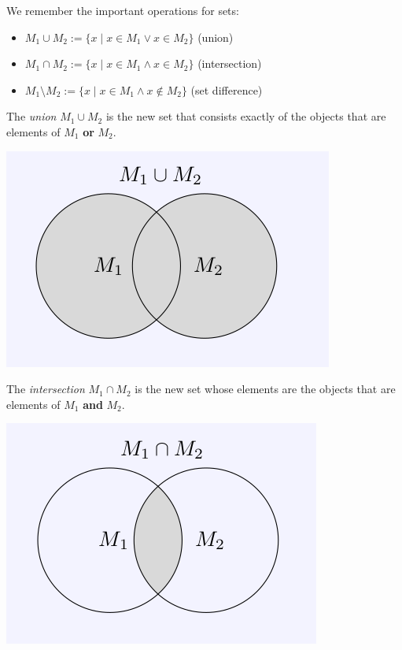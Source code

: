 

We remember the important operations for sets:

\begin{itemize}
 \item $M_1 \cup M_2 := \{ x \mid x\in M_1 \vee x \in M_2 \}$ (union)
 \item $M_1 \cap M_2 := \{ x \mid x \in M_1 \wedge x \in M_2\}$ (intersection)
 \item $M_1 \setminus M_2 := \{ x \mid x \in M_1 \wedge x \not\in M_2 \}$ (set difference)
\end{itemize}

\begin{Definition}
   The \emph{union} $M_1\cup M_2$ is the new set that consists exactly of the objects that are elements of $M_1$ \textbf{or} $M_2$.
  
   \includegraphics{./union.png}
  
  The \emph{intersection} $M_1\cap M_2$ is the new set whose elements are the objects that are elements of $M_1$ \textbf{and} $M_2$.
  
  \includegraphics{./inter.png}


\end{Definition}
